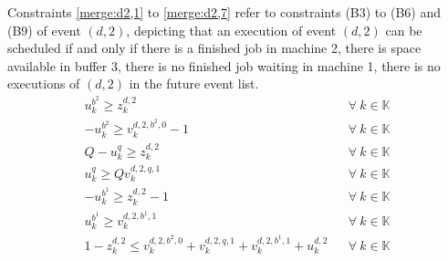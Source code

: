 \documentclass[]{interact}
\theoremstyle{plain}%
\theoremstyle{definition}
\theoremstyle{remark}
\begin{document}
Constraints \eqref{merge:d2,1} to \eqref{merge:d2,7} refer to constraints (B3) to (B6) and (B9) of event ${(d,2)}$, depicting that an execution of event ${(d,2)}$ can be scheduled if and only if there is a finished job in machine 2, there is space available in buffer 3, there is no finished job waiting in machine 1, there is no executions of ${(d,2)}$ in the future event list. 
\begin{eqnarray}
u^{b^2}_k\ge z^{d,2}_k&& \forall\ k\in \mathbb{K}\label{merge:d2,1}\\
-u^{b^2}_k\ge v^{d,2,b^2,0}_k-1&& \forall\ k\in \mathbb{K}\label{merge:d2,2}\\
Q-u^{q}_k\ge z^{d,2}_k&& \forall\ k\in \mathbb{K}\label{merge:d2,3}\\
u^{q}_k\ge Qv^{d,2,q,1}_k&& \forall\ k\in \mathbb{K}\label{merge:d2,4}\\
-u^{b^1}_k\ge z^{d,2}_k-1&& \forall\ k\in \mathbb{K}\label{merge:d2,5}\\
u^{b^1}_k\ge v^{d,2,b^1,1}_k&& \forall\ k\in \mathbb{K}\label{merge:d2,6}\\
1-z^{d,2}_k\le v^{d,2,b^2,0}_k+v^{d,2,q,1}_k+v^{d,2,b^1,1}_k+u^{d,2}_k&& \forall\ k\in \mathbb{K}\label{merge:d2,7}
\end{eqnarray}
\end{document}
